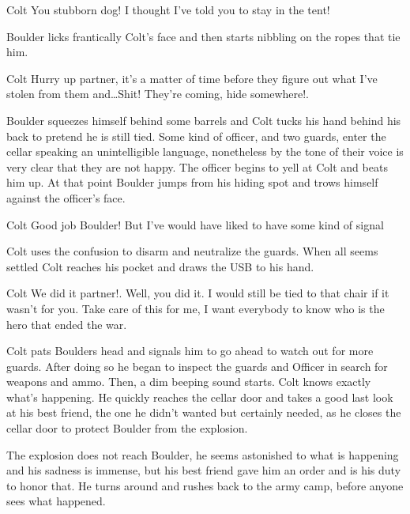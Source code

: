 \documentclass{screenplay}[2012/06/30]
\begin{document}
\begin{dialogue}{Colt}
    You stubborn dog! I thought I've told you to stay in the 
    tent!
\end{dialogue}

Boulder licks frantically Colt's face and then starts nibbling
on the ropes that tie him.

\begin{dialogue}[Whispering]{Colt}
    Hurry up partner, it's a matter of time before they 
    figure out what I've stolen from them and\dots Shit! 
    They're coming, hide somewhere!.
\end{dialogue}

Boulder squeezes himself behind some barrels and Colt tucks 
his hand behind his back to pretend he is still tied. Some 
kind of officer, and two guards, enter the cellar speaking an unintelligible
language, nonetheless by the tone of their voice is very clear 
that they are not happy. The officer begins to yell at Colt and beats him up.
At that point Boulder jumps from his hiding spot and trows 
himself against the officer's face. 

\begin{dialogue}{Colt}
    Good job Boulder! But I've would have liked to have some
    kind of signal
\end{dialogue}

Colt uses the confusion to disarm and neutralize the guards.
When all seems settled Colt reaches his pocket and draws the 
USB to his hand.

\begin{dialogue}[Panting]{Colt}
    We did it partner!. Well, you did it. I would still be
    tied to that chair if it wasn't for you. Take care of 
    this for me, I want everybody to know who is the hero 
    that ended the war.
\end{dialogue}

Colt pats Boulders head and signals him to go ahead to watch 
out for more guards. After doing so he began to inspect the 
guards and Officer in search for weapons and ammo. Then, a 
dim beeping sound starts. Colt knows exactly what's happening.
He quickly reaches the cellar door and takes a good last look
at his best friend, the one he didn't wanted but certainly needed, 
as he closes the cellar door to protect Boulder from the explosion.

The explosion does not reach Boulder, he seems astonished 
to what is happening and his sadness is immense, but his 
best friend gave him an order and is his duty to honor that.
He turns around and rushes back to the army camp, before 
anyone sees what happened.
\end{document}

